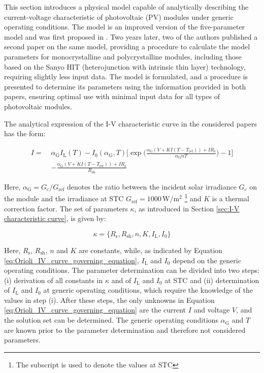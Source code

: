 
This section introduces a physical model capable of analytically describing
the current-voltage characteristic of photovoltaic (PV) modules under generic
operating conditions. The model is an improved version of the five-parameter
model and was first proposed in \cite{LoBrano}. Two years later,
two of the authors published a second paper \cite{Orioli} on the same model,
providing a procedure to calculate the model parameters for monocrystalline
and polycrystalline modules, including those based on the Sanyo HIT
(heterojunction with intrinsic thin layer) technology, requiring slightly
less input data. The model is formulated, and a procedure is presented to
determine its parameters using the information provided in both papers,
ensuring optimal use with minimal input data for all types of photovoltaic
modules.

The analytical expression of the I-V characteristic curve in the
considered papers has the form:

\begin{align}
    I = \; &\alpha_{\text{G}}I_{\text{L}}(T) - I_{0}(\alpha_{\text{G}}, T)\Biggl[\exp\biggl(\frac{\alpha_{\text{G}}(V + KI(T - T_{\text{ref}}))+IR_{\text{s}}}{\alpha_{\text{G}}nT}\biggr) - 1\Biggr] \nonumber \\
                       &- \frac{\alpha_{\text{G}}(V + KI(T - T_{\text{ref}}))+IR_{\text{s}}}{R_{\text{sh}}}
    \label{eq:Orioli_IV_curve_governing_equation}
\end{align}

\noindent
Here, \(\alpha_{\text{G}} = G_{\text{c}} / G_{\text{ref}}\) denotes the ratio between
the incident solar irradiance \(G_{c}\) on the module and the irradiance at STC
\(G_{\text{ref}} = 1000 \, \si{\watt\per\meter\squared}\) \footnote{The subscript  is used to denote the values at STC}
and \(K\) is a thermal correction
factor. The set of parameters \(\kappa\), as introduced in Section
\ref{sec:I-V characteristic curve}, is given by:

\begin{equation}
    \kappa = \{R_{\text{s}}, R_{\text{sh}}, n, K, I_{\text{L}}, I_{0}\}
\end{equation}

\noindent
Here, \(R_{\text{s}}\), \(R_{\text{sh}}\), \(n\) and \(K\) are constants, while, as indicated by Equation
\ref{eq:Orioli_IV_curve_governing_equation}, \(I_{\text{L}}\) and \(I_{0}\) depend on the
generic operating conditions. The parameter determination can be divided into two steps:
(i) derivation of all constants in \(\kappa\) and of \(I_{\text{L}}\) and \(I_{0}\) at STC and (ii)
determination of \(I_{\text{L}}\) and \(I_{0}\) at generic operating conditions, which require the knowledge
of the values in step (i). After these steps, the only unknowns in Equation \ref{eq:Orioli_IV_curve_governing_equation}
are the current \(I\) and voltage \(V\), and the solution set can be determined. The generic
operating conditions \(\alpha_{\text{G}}\) and \(T\) are known prior to the parameter determination
and therefore not considered parameters.

